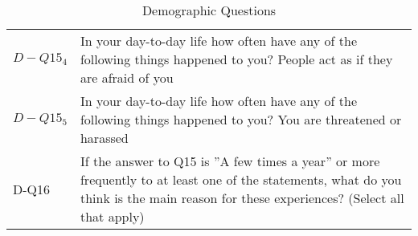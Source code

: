 \begin{table}[!hbpt]
\begin{tabularx}{\linewidth}{l|X}
         $D-Q15_4$ & In your day-to-day life how often have any of the following things happened to you? People act as if they are afraid of you\\
         $D-Q15_5$ & In your day-to-day life how often have any of the following things happened to you? You are threatened or harassed\\
         D-Q16 & If the answer to Q15 is ''A few times a year'' or more frequently to at least one of the statements, what do you think is the main reason for these experiences? (Select all that apply) \\
    \bottomrule
    \end{tabularx}
    \caption{Demographic Questions}
    \label{app:demographic-questions}
\end{table}